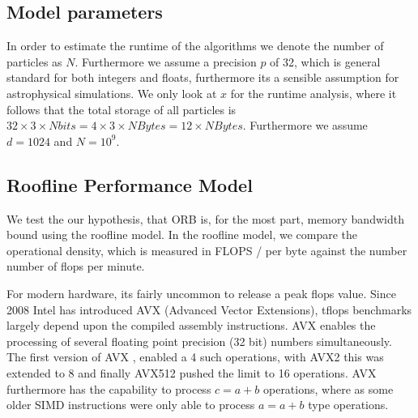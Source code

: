 \documentclass[]{article}
\begin{document}
\subsection{Model parameters}

\begin{comment}
If we investigate the operations which are needed for the binary cut algorithm, we notice that the actual operations completed inside the loop, are only very few. When comparing the CPU implementation with GPU one, we need to not only consider benefits from increased parallelism in GPU hardware, which will lead to a higher tflops, but also possible speed-ups reached by higher bandwidths in GPU memory than CPU memory. On the other hand we need to mitigate the very low bandwidths between the GPU and CPU, which cannot be avoided altogether, as the data needs to be sent from the CPU to GPU before we can process it on the graphics processor.
\end{comment}

In order to estimate the runtime of the algorithms we denote the number of particles as $N$. Furthermore we assume a precision $p$ of 32, which is general standard for both integers and floats, furthermore its a sensible assumption for astrophysical simulations. We only look at $x$ for the runtime analysis, where it follows that the total storage of all particles is $32 \times 3 \times N bits = 4 \times 3 \times N Bytes = 12 \times N Bytes$. Furthermore we assume $d = 1024$ and $N=10^9$.


\subsection{Roofline Performance Model}

We test the our hypothesis, that ORB is, for the most part, memory bandwidth bound using the roofline model. In the roofline model, we compare the operational density, which is measured in FLOPS / per byte against the number number of flops per minute. 

For modern hardware, its fairly uncommon to release a peak flops value. Since 2008 Intel has introduced AVX (Advanced Vector Extensions), tflops benchmarks largely depend upon the compiled assembly instructions. AVX enables the processing of several floating point precision (32 bit) numbers simultaneously. The first version of AVX , enabled a 4 such operations, with AVX2 this was extended to 8 and finally AVX512 pushed the limit to 16 operations. AVX furthermore has the capability to process $c = a + b$ operations, where as some older SIMD instructions were only able to process $a = a + b$ type operations. 
\end{document}
